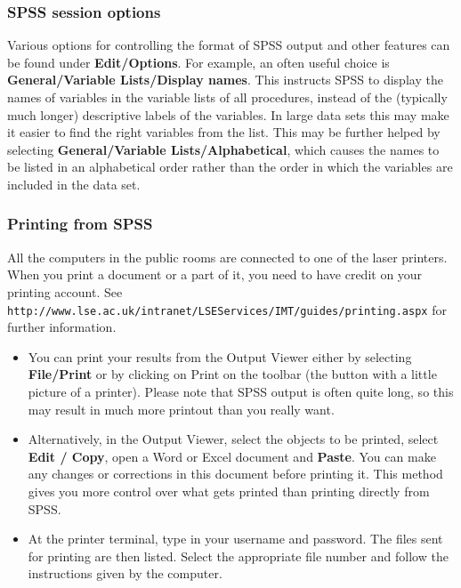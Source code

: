 \vspace*{-3ex}
\subsubsection{SPSS session options}
\vspace*{-2ex}
Various options for controlling the format of SPSS output and other
features can be found under \textbf{Edit/Options}. For example,
an often useful choice is
\textbf{General/Variable Lists/Display names}\label{p_listoptions}. This
instructs SPSS to display the names of
variables in the variable lists of all procedures, instead of the
(typically much longer) descriptive labels of the variables. In large
data sets this may make it easier to find the right variables from the
list. This may be further helped by
selecting \textbf{General/Variable Lists/Alphabetical}, which causes the
names to be listed in an alphabetical order rather than the
order in which the variables are included in the data set.

\vspace*{-3ex}
\subsubsection{Printing from SPSS}
\vspace*{-2ex}

All the computers in the public rooms are connected to one of the
laser printers. When you print a document or a part of it, you need to
have credit on your printing account.
See
\small{\texttt{http://www.lse.ac.uk/intranet/LSEServices/IMT/guides/printing.aspx}}
\normalsize
for further information.

\begin{itemize}
\item
You can print your results from the Output Viewer either by selecting
\textbf{File/Print} or by clicking on Print on the toolbar (the button
with a little picture of a printer). Please note that SPSS output is
often quite long, so this may result in much more printout than you
really want.
\item
Alternatively, in the Output Viewer, select the objects to be printed,
select \textbf{Edit / Copy}, open a Word or Excel document
and \textbf{Paste}. You can make any changes or corrections in this
document before printing it. This method gives you more control over
what gets printed than printing directly from SPSS.
\item
At the printer terminal, type in your username and password. The files
sent for printing are then listed.  Select the appropriate file number
and follow the instructions given by the computer.
\end{itemize}

